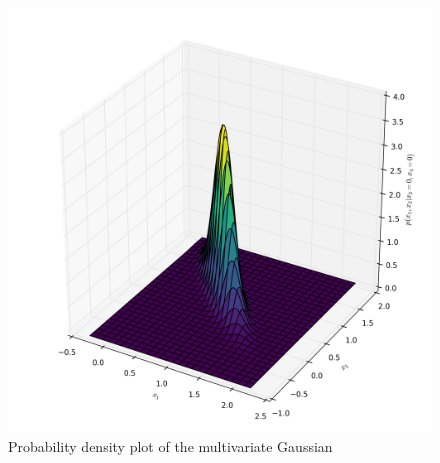 \documentclass{article}
\begin{document}
\begin{enumerate}
\begin{figure}[H]
\includegraphics[width=\textwidth]{images/cond_mvg.png}
\caption{Probability density plot of the multivariate Gaussian}
\label{fig:cond_mvg}
\end{figure}
\end{enumerate}
\pagebreak
\end{document}
